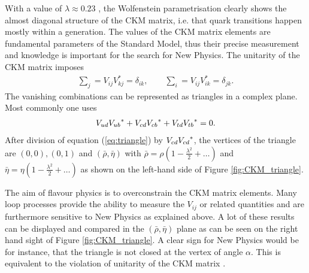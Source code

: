 With a value of $\lambda \approx 0.23$ \cite{PDG}, the Wolfenstein parametrisation clearly shows the almost diagonal structure of the CKM matrix, i.e. that quark transitions happen mostly within a generation.
The values of the CKM matrix elements are fundamental parameters of the Standard Model, thus their precise measurement and knowledge is important for the search for New Physics.
The unitarity of the CKM matrix imposes
\begin{align}
    \sum_j = V_{ij}V_{kj}^{\ast} = \delta_{ik}, \qquad \sum_i = V_{ij}V_{ik}^{\ast} = \delta_{jk}.
\end{align}
The vanishing combinations can be represented as triangles in a complex plane.
Most commonly one uses
\begin{align}
    {\ensuremath{V_{{u}{d}}}}{\ensuremath{V_{{u}{b}}}}^{\ast} + {V_{{c}{d}}}{V_{{c}{b}}}^{*} + {V_{{t}{d}}}{V_{{t}{b}}}^{\ast} = 0. \label{eq:triangle}
\end{align}
After division of equation (\ref{eq:triangle}) by ${V_{{c}{d}}}{V_{{c}{d}}}^{\ast}$, the vertices of the triangle are $(0,0), (0,1)$ and $(\bar{\rho}, \bar{\eta})$ with $\bar{\rho} = \rho (1 - \frac{\lambda^2}{2} + \ldots)$ and $\bar{\eta} = \eta (1 - \frac{\lambda^2}{2} + \ldots)$ as shown on the left-hand side of
Figure \ref{fig:CKM_triangle}.

The aim of flavour physics is to overconstrain the CKM matrix elements.
Many loop processes provide the ability to measure the $V_{ij}$ or related quantities and are furthermore sensitive to New Physics as explained above.
A lot of these results can be displayed and compared in the $(\bar{\rho}, \bar{\eta})$ plane as can be seen on the right hand sight of Figure \ref{fig:CKM_triangle}.
A clear sign for New Physics would be for instance, that the triangle is not closed at the vertex of angle $\alpha$.
This is equivalent to the violation of unitarity of the CKM matrix \cite{PDG, Nierste}.

